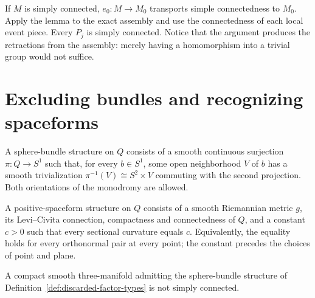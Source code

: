 If $M$ is simply connected, $e_0:M\to M_0$ transports simple connectedness
to $M_0$.  Apply the lemma to the exact assembly and use the connectedness
of each local event piece.  Every $P_j$ is simply connected.  Notice that
the argument produces the retractions from the assembly: merely having
a homomorphism into a trivial group would not suffice.

\section{Excluding bundles and recognizing spaceforms}
\label{sec:factor-classification}

\begin{definition}
\label{def:discarded-factor-types}
A sphere-bundle structure on $Q$ consists of a smooth continuous surjection
$\pi:Q\to S^1$ such that, for every $b\in S^1$, some open neighborhood
$V$ of $b$ has a smooth trivialization
$\pi^{-1}(V)\cong S^2\times V$ commuting with the second projection.
Both orientations of the monodromy are allowed.

A positive-spaceform structure on $Q$ consists of a smooth Riemannian
metric $g$, its Levi--Civita connection, compactness and connectedness of
$Q$, and a constant $c>0$ such that every sectional curvature equals $c$.
Equivalently, the equality holds for every orthonormal pair at every
point; the constant precedes the choices of point and plane.
\end{definition}

\begin{lemma}
\label{lem:sphere-bundle-obstruction}
A compact smooth three-manifold admitting the sphere-bundle structure
of Definition~\ref{def:discarded-factor-types} is not simply connected.
\end{lemma}

